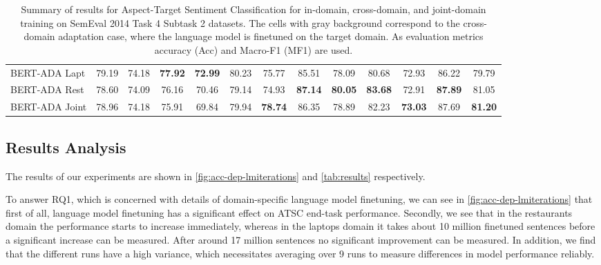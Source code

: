 \documentclass[11pt,a4paper]{article}
\newcommand{\lgray}{\cellcolor{lightgray!25}}
\newcommand{\rood}[1]{}
\begin{document}
\begin{table*}[h!]
\begin{center}
{\begin{tabular}{lcccccc|cccccc}
BERT-ADA Lapt & 79.19 & 74.18 & \lgray \textbf{77.92}  & \lgray \textbf{72.99} & 80.23 & 75.77 &
85.51 & 78.09 & 80.68  & 72.93  & 86.22 & 79.79  \\

BERT-ADA Rest & 78.60  &  74.09 & 76.16  & 70.46  & 79.14 & 74.93 &
\textbf{87.14}  & \textbf{80.05} & \lgray \textbf{83.68}  & \lgray 72.91 & \textbf{87.89} & 81.05 \\

BERT-ADA Joint & 78.96  & 74.18  & 75.91 & 69.84  & 79.94 & \textbf{78.74} &
86.35  & 78.89  & 82.23 & \textbf{73.03}  & 87.69  & \textbf{81.20} \\
\bottomrule
\end{tabular}
}
\end{center}
\caption{Summary of results for Aspect-Target Sentiment Classification for in-domain, cross-domain, and joint-domain training on SemEval 2014 Task 4 Subtask 2 datasets. 
The cells with gray background correspond to the cross-domain adaptation case, where 
the language model is finetuned on the target domain.
As evaluation metrics accuracy (Acc) and Macro-F1 (MF1) are used. }\label{tab:results}
\end{table*}

\subsection{Results Analysis}
\rood{Outcome: Readers should get a feel for why the results are how they are. 
  First describe the bigger picture in the sense like method x/y performs best.
  We think that method x/y perform best because of w/z \\
  First split results into Categories and then 
  think about all the relevant statements you want to make
}
The results of our experiments are shown in \autoref{fig:acc-dep-lmiterations} 
and \autoref{tab:results} respectively.

To answer RQ1, which is concerned with details of domain-specific language model finetuning, we can see in \autoref{fig:acc-dep-lmiterations} that first of all, language model finetuning has a significant effect on ATSC end-task performance. 
Secondly, we see that in the restaurants domain the performance starts to increase immediately, whereas in the laptops domain it takes about 10 million finetuned sentences before a significant increase can be measured.
After around 17 million sentences no significant improvement can be measured.
In addition, we find that the different runs have a high variance, which necessitates averaging over 9 runs to measure differences in model performance reliably.
\end{document}
